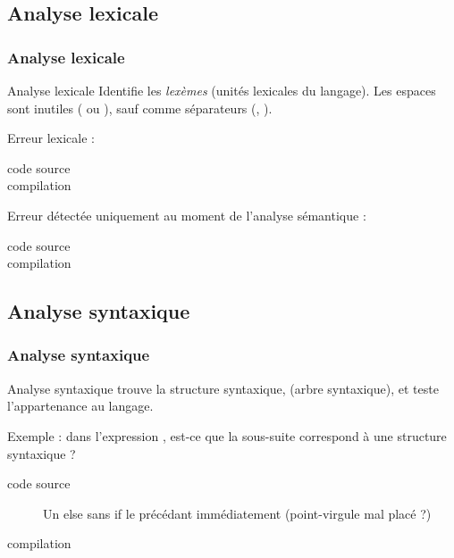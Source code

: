 \documentclass[xcolor=pdftex,svgnames,table]{beamer}
\begin{document}
\subsection{Analyse lexicale}
\begin{frame}
  \frametitle{Analyse lexicale}
\begin{block}{Analyse lexicale}
 Identifie les \emph{lexèmes} (unités lexicales du langage). Les espaces sont inutiles ( ou ), sauf comme séparateurs (, ).
\end{block}
\pause
Erreur lexicale :
\begin{description}
\item[code source] 
\item[compilation] 
\end{description}
\pause
Erreur détectée uniquement au moment de l'analyse sémantique :\\
\begin{description}
\item[code source] 
\item[compilation] 
\end{description}
\end{frame}

\subsection{Analyse syntaxique}
\begin{frame}
  \frametitle{Analyse syntaxique}
\begin{block}{Analyse syntaxique\youwrite}
trouve la structure syntaxique, (arbre
  syntaxique), et teste l'appartenance au langage.
\end{block}
\pause
Exemple : dans l'expression , est-ce que la
sous-suite   correspond à une structure syntaxique ?
\pause
\begin{center}
\end{center}
\pause
\begin{description}
\item[code source] Un else sans if le précédant immédiatement (point-virgule mal placé ?)
\item[compilation] 
\end{description}

\end{frame}
\end{document}
